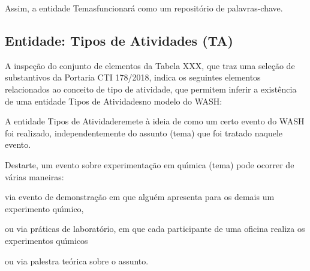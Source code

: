 \documentclass[
12pt,		%
openright,	%
twoside,  %
a4paper,			%
chapter=TITLE,		%
english,			%
french,				%
spanish,			%
brazil				%
]{USPSC-classe/USPSC}
\begin{document}
Assim, a entidade \textquotedbl Temas\textquotedbl  funcionar\'a como um reposit\'orio de palavras-chave.




\subsection[Entidade: Tipos de Atividades (TA)]{Entidade: Tipos de Atividades (TA)}\label{Entidade: Tipos de Atividades (TA)}
A inspe\c{c}\~ao do conjunto de elementos da Tabela XXX, que traz uma sele\c{c}\~ao de substantivos da Portaria CTI 178/2018, indica os seguintes elementos relacionados ao conceito de \textquotedbl tipo de atividade\textquotedbl , que permitem inferir a exist\^encia de uma entidade \textquotedbl Tipos de Atividades\textquotedbl  no modelo do WASH:





\noindent\begin{center}\mbox{\centering{}}\end{center}


A entidade \textquotedbl Tipos de Atividade\textquotedbl  remete \`a ideia de como um certo evento do WASH foi realizado, independentemente do assunto (tema) que foi tratado naquele evento.




Destarte, um evento sobre experimenta\c{c}\~ao em qu\'{\i}mica (tema) pode ocorrer de v\'arias maneiras:





\begin{alineas}
\item via evento de demonstra\c{c}\~ao em que algu\'em apresenta para os demais um experimento qu\'{\i}mico,
\item ou via pr\'aticas de laborat\'orio, em que cada participante de uma oficina realiza os experimentos qu\'{\i}micos
\item ou via palestra te\'orica sobre o assunto.
\end{alineas}
\end{document}
